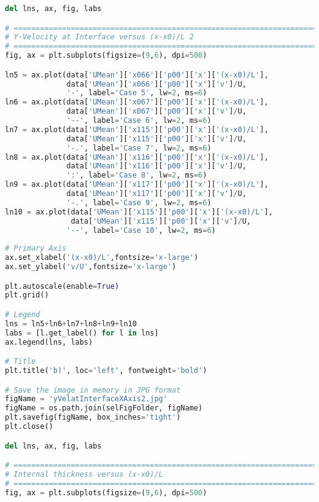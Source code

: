 \begin{lstlisting}[language=python]
del lns, ax, fig, labs

# =============================================================================
# Y-Velocity at Interface versus (x-x0)/L 2
# =============================================================================
fig, ax = plt.subplots(figsize=(9,6), dpi=500)

ln5 = ax.plot(data['UMean']['x066']['p00']['x']['(x-x0)/L'],
              data['UMean']['x066']['p00']['x']['v']/U,
              '-', label='Case 5', lw=2, ms=6)
ln6 = ax.plot(data['UMean']['x067']['p00']['x']['(x-x0)/L'],
              data['UMean']['x067']['p00']['x']['v']/U,
              '--', label='Case 6', lw=2, ms=6)
ln7 = ax.plot(data['UMean']['x115']['p00']['x']['(x-x0)/L'],
              data['UMean']['x115']['p00']['x']['v']/U,
              '-.', label='Case 7', lw=2, ms=6)
ln8 = ax.plot(data['UMean']['x116']['p00']['x']['(x-x0)/L'],
              data['UMean']['x116']['p00']['x']['v']/U,
              ':', label='Case 8', lw=2, ms=6)
ln9 = ax.plot(data['UMean']['x117']['p00']['x']['(x-x0)/L'],
              data['UMean']['x117']['p00']['x']['v']/U,
              '-.', label='Case 9', lw=2, ms=6)
ln10 = ax.plot(data['UMean']['x115']['p00']['x']['(x-x0)/L'],
               data['UMean']['x115']['p00']['x']['v']/U,
              '--', label='Case 10', lw=2, ms=6)
    
# Primary Axis
ax.set_xlabel('(x-x0)/L',fontsize='x-large')
ax.set_ylabel('v/U',fontsize='x-large')

plt.autoscale(enable=True)
plt.grid()

# Legend
lns = ln5+ln6+ln7+ln8+ln9+ln10
labs = [l.get_label() for l in lns]
ax.legend(lns, labs)

# Title
plt.title('b)', loc='left', fontweight='bold')

# Save the image in memory in JPG format
figName = 'yVelatInterfaceXAxis2.jpg'
figName = os.path.join(selFigFolder, figName)
plt.savefig(figName, box_inches='tight')
plt.close()

del lns, ax, fig, labs

# =============================================================================
# Internal thickness versus (x-x0)/L
# =============================================================================
fig, ax = plt.subplots(figsize=(9,6), dpi=500)


\end{lstlisting}
